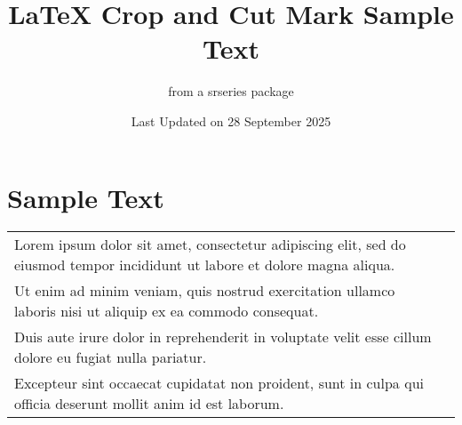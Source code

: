 \documentclass{article}
\begin{document}
\noindent

\title{LaTeX Crop and Cut Mark Sample Text}
\author{from a srseries package}
\date{Last Updated on 28 September 2025}
\maketitle

\noindent
\section{Sample Text}
\begin{tabular}{lr}
  {Lorem ipsum dolor sit amet, consectetur adipiscing elit, sed do eiusmod tempor incididunt ut labore et dolore magna aliqua.} \\ {Ut enim ad minim veniam, quis nostrud exercitation ullamco laboris nisi ut aliquip ex ea commodo consequat.} \\ {Duis aute irure dolor in reprehenderit in voluptate velit esse cillum dolore eu fugiat nulla pariatur.} \\ {Excepteur sint occaecat cupidatat non proident, sunt in culpa qui officia deserunt mollit anim id est laborum.}
  \end{tabular}
  
\end{document}
